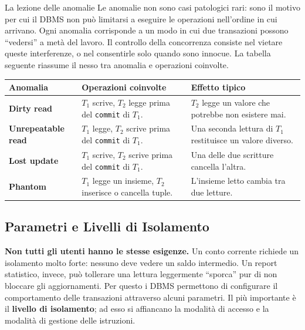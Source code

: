 \documentclass[12pt]{extarticle}
\begin{document}
\begin{cbox}{La lezione delle anomalie}
\noindent Le anomalie non sono casi patologici rari: sono il motivo per cui il DBMS non può limitarsi a eseguire le operazioni nell'ordine in cui arrivano. Ogni anomalia corrisponde a un modo in cui due transazioni possono ``vedersi'' a metà del lavoro. Il controllo della concorrenza consiste nel vietare queste interferenze, o nel consentirle solo quando sono innocue. La tabella seguente riassume il nesso tra anomalia e operazioni coinvolte.
\begin{center}
\small
\begin{tabular}{@{}lp{5.4cm}p{6.2cm}@{}}
    \toprule
    \textbf{Anomalia} & \textbf{Operazioni coinvolte} & \textbf{Effetto tipico} \\
    \midrule
    \textbf{Dirty read} & $T_1$ scrive, $T_2$ legge prima del \texttt{commit} di $T_1$. & $T_2$ legge un valore che potrebbe non esistere mai. \\
    \addlinespace
    \textbf{Unrepeatable read} & $T_1$ legge, $T_2$ scrive prima del \texttt{commit} di $T_1$. & Una seconda lettura di $T_1$ restituisce un valore diverso. \\
    \addlinespace
    \textbf{Lost update} & $T_1$ scrive, $T_2$ scrive prima del \texttt{commit} di $T_1$. & Una delle due scritture cancella l'altra. \\
    \addlinespace
    \textbf{Phantom} & $T_1$ legge un insieme, $T_2$ inserisce o cancella tuple. & L'insieme letto cambia tra due letture. \\
    \bottomrule
\end{tabular}
\end{center}
\end{cbox}

\subsection{Parametri e Livelli di Isolamento}

\noindent \textbf{Non tutti gli utenti hanno le stesse esigenze.} Un conto corrente richiede un isolamento molto forte: nessuno deve vedere un saldo intermedio. Un report statistico, invece, può tollerare una lettura leggermente ``sporca'' pur di non bloccare gli aggiornamenti. Per questo i DBMS permettono di configurare il comportamento delle transazioni attraverso alcuni parametri. Il più importante è il \textbf{livello di isolamento}; ad esso si affiancano la modalità di accesso e la modalità di gestione delle istruzioni.
\end{document}
